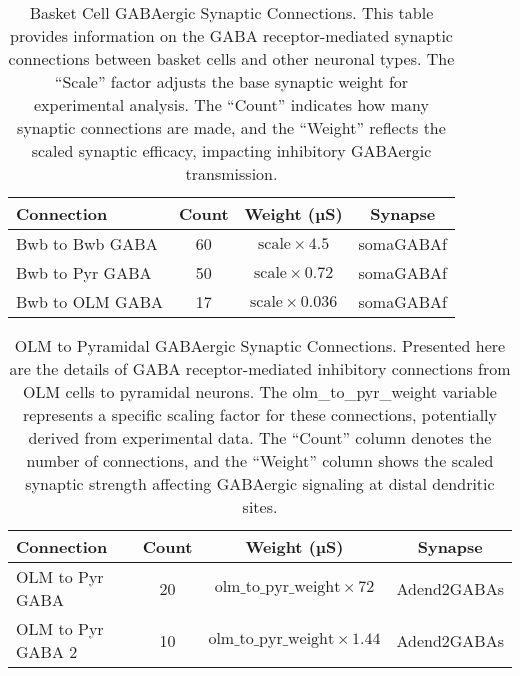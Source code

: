 \begin{table}[htbp]
    \centering
    \caption[Bwb to Other Cells GABA Connections Summary]{Basket Cell GABAergic Synaptic Connections. This table provides information on the GABA receptor-mediated synaptic connections between basket cells and other neuronal types. The ``Scale'' factor adjusts the base synaptic weight for experimental analysis. The ``Count'' indicates how many synaptic connections are made, and the ``Weight'' reflects the scaled synaptic efficacy, impacting inhibitory GABAergic transmission.}\label{tab:bwb_gaba_connections}
    \begin{tabular}{lccc}
        \hline
        Connection      & Count & Weight (µS)                     & Synapse   \\
        \hline
        Bwb to Bwb GABA & 60    & \( \text{scale} \times 4.5 \)   & somaGABAf \\
        Bwb to Pyr GABA & 50    & \( \text{scale} \times 0.72 \)  & somaGABAf \\
        Bwb to OLM GABA & 17    & \( \text{scale} \times 0.036 \) & somaGABAf \\
        \hline
    \end{tabular}
\end{table}

\begin{table}[htbp]
    \centering
    \caption[OLM to Pyr GABA Connections Summary]{OLM to Pyramidal GABAergic Synaptic Connections. Presented here are the details of GABA receptor-mediated inhibitory connections from OLM cells to pyramidal neurons. The olm\_to\_pyr\_weight variable represents a specific scaling factor for these connections, potentially derived from experimental data. The ``Count'' column denotes the number of connections, and the ``Weight'' column shows the scaled synaptic strength affecting GABAergic signaling at distal dendritic sites.}\label{tab:olm_gaba_connections}
    \begin{tabular}{lccc}
        \hline
        Connection        & Count & Weight (µS)                                   & Synapse     \\
        \hline
        OLM to Pyr GABA   & 20    & \( \text{olm\_to\_pyr\_weight} \times 72 \)   & Adend2GABAs \\
        OLM to Pyr GABA 2 & 10    & \( \text{olm\_to\_pyr\_weight} \times 1.44 \) & Adend2GABAs \\
        \hline
    \end{tabular}
\end{table}\pagebreak

